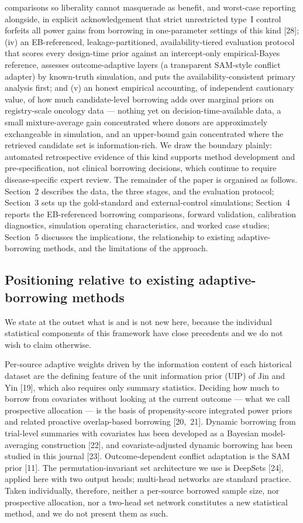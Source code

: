 \documentclass[11pt]{article}
\begin{document}
comparisons so liberality cannot masquerade as benefit, and worst-case
reporting alongside, in explicit acknowledgement that strict unrestricted
type~I control forfeits all power gains from borrowing in one-parameter
settings of this kind [28];
(iv) an EB-referenced, leakage-partitioned, availability-tiered evaluation
protocol that scores every design-time prior against an intercept-only
empirical-Bayes reference, assesses outcome-adaptive layers (a transparent
SAM-style conflict adapter) by known-truth simulation, and puts the
availability-consistent primary analysis first; and
(v) an honest empirical accounting, of independent cautionary value, of how
much candidate-level borrowing adds over marginal priors on registry-scale
oncology data --- nothing yet on decision-time-available data, a small
mixture-average gain concentrated where donors are approximately
exchangeable in simulation, and an upper-bound gain concentrated where the
retrieved candidate set is information-rich. We draw the
boundary plainly: automated retrospective evidence of this kind supports method
development and pre-specification, not clinical borrowing decisions, which
continue to require disease-specific expert review. The remainder of the paper
is organised as follows. Section~2 describes the data, the three stages, and
the evaluation protocol; Section~3 sets up the gold-standard and
external-control simulations; Section~4 reports the EB-referenced borrowing
comparisons, forward validation, calibration diagnostics, simulation operating
characteristics, and worked case studies; Section~5 discusses the
implications, the relationship to existing adaptive-borrowing methods, and the
limitations of the approach.


\subsection*{Positioning relative to existing adaptive-borrowing methods}

We state at the outset what is and is not new here, because the individual
statistical components of this framework have close precedents and we do not
wish to claim otherwise.

Per-source adaptive weights driven by the information content of each
historical dataset are the defining feature of the unit information prior (UIP)
of Jin and Yin [19], which also requires only summary statistics. Deciding how
much to borrow from covariates without looking at the current outcome --- what
we call prospective allocation --- is the basis of propensity-score integrated
power priors and related proactive overlap-based borrowing [20,~21]. Dynamic
borrowing from trial-level summaries with covariates has been developed as a
Bayesian model-averaging construction [22], and covariate-adjusted dynamic
borrowing has been studied in this journal [23]. Outcome-dependent conflict
adaptation is the SAM prior [11]. The permutation-invariant set architecture we
use is DeepSets [24], applied here with two output heads; multi-head networks
are standard practice. Taken individually, therefore, neither a per-source
borrowed sample size, nor prospective allocation, nor a two-head set network
constitutes a new statistical method, and we do not present them as such.
\end{document}
